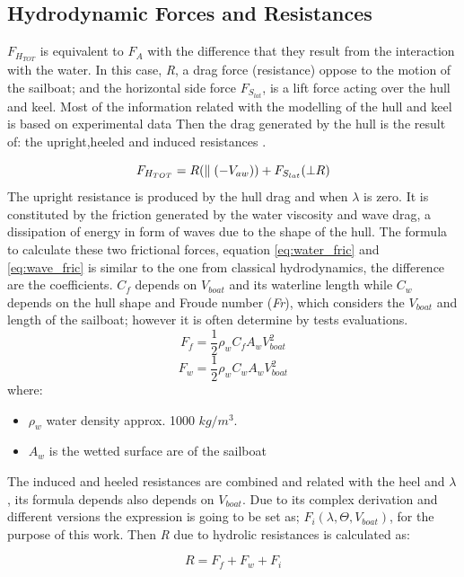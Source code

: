 \subsection {Hydrodynamic Forces and Resistances}
$F_{H_{TOT}}$ is equivalent to $F_{A}$ with the difference that they result from the interaction with the water. In this case, \textit{R}, a drag force (resistance) oppose to the motion of the sailboat; and the horizontal side force $F_{S_{lat}}$, is a lift force acting over the hull and keel. Most of the information related with the modelling of the hull and keel is based on experimental data%
Then the drag generated by the hull is the result of: the  upright,heeled and induced resistances \cite{philpott1993yacht}.\par
\begin{equation}
    F_{H_{TOT}}=R(\parallel( -V_{aw})) + F_{S_{lat}}(\bot R )\\
\end{equation}
The upright resistance is produced by the hull drag and when $\lambda$ is zero. It is constituted by the friction generated by the water viscosity and wave drag, a dissipation of energy in form of waves due to the shape of the hull.  The  formula to calculate these two frictional forces, equation \ref{eq:water_fric} and \ref{eq:wave_fric} is similar to the one from classical hydrodynamics, the difference are the coefficients. $C_{f}$ depends on $V_{boat}$ and its waterline length while $C_{w}$ depends on the hull shape and Froude number (\textit{Fr}), which considers the $V_{boat}$ and length of the sailboat; however it is often determine by tests evaluations.
\begin{equation}\label{eq:water_fric}
 F_{f}=\frac{1}{2}\rho_{w} C_{f} A_{w} V_{boat}^2
\end{equation}
\begin{equation}\label{eq:wave_fric}
 F_{w}=\frac{1}{2}\rho_{w} C_{w} A_{w} V_{boat}^2
\end{equation}
where:
\begin{itemize} \label{R_symbols}
    \item $\rho_{w}$ water density approx. 1000 $kg/m^3$.
    \item $A_{w}$ is the wetted surface are of the sailboat
\end{itemize}
The induced and heeled resistances are combined and related with the heel and $\lambda$, its formula depends also depends on $V_{boat}$. Due to its complex derivation and different versions the expression is going to be set as; $F_{i}(\lambda,\Theta,V_{boat})$, for the purpose of this work. Then \textit{R} due to hydrolic resistances is calculated as: \par 
\begin{equation} \label{eq:R_total}
    R=F_{f}+F_{w}+F_{i}
\end{equation}


